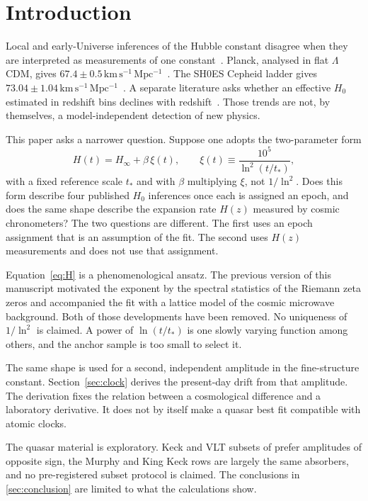 \section{Introduction}
\label{sec:intro}

Local and early-Universe inferences of the Hubble constant disagree when they are interpreted as measurements of one constant~\citep{DiValentino2021,Schoneberg2022}.
Planck, analysed in flat $\Lambda$CDM, gives $67.4\pm0.5\,\mathrm{km\,s^{-1}\,Mpc^{-1}}$~\citep{Planck2018VI}.
The SH0ES Cepheid ladder gives $73.04\pm1.04\,\mathrm{km\,s^{-1}\,Mpc^{-1}}$~\citep{RiessSH0ES2022}.
A separate literature asks whether an effective $H_{0}$ estimated in redshift bins declines with redshift~\citep{Krishnan2020,Dainotti2021,Colgain2022}.
Those trends are not, by themselves, a model-independent detection of new physics.

This paper asks a narrower question.
Suppose one adopts the two-parameter form
\begin{equation}
  H(t)=H_{\infty}+\beta\,\xi(t),
  \qquad
  \xi(t)\equiv\frac{10^{5}}{\ln^{2}(t/t_{*})},
  \label{eq:H}
\end{equation}
with a fixed reference scale $t_{*}$ and with $\beta$ multiplying $\xi$, not $1/\ln^{2}$.
Does this form describe four published $H_{0}$ inferences once each is assigned an epoch, and does the same shape describe the expansion rate $H(z)$ measured by cosmic chronometers?
The two questions are different.
The first uses an epoch assignment that is an assumption of the fit.
The second uses $H(z)$ measurements and does not use that assignment.

Equation~\eqref{eq:H} is a phenomenological ansatz.
The previous version of this manuscript motivated the exponent by the spectral statistics of the Riemann zeta zeros and accompanied the fit with a lattice model of the cosmic microwave background.
Both of those developments have been removed.
No uniqueness of $1/\ln^{2}$ is claimed.
A power of $\ln(t/t_{*})$ is one slowly varying function among others, and the anchor sample is too small to select it.

The same shape is used for a second, independent amplitude in the fine-structure constant.
Section~\ref{sec:clock} derives the present-day drift from that amplitude.
The derivation fixes the relation between a cosmological difference and a laboratory derivative.
It does not by itself make a quasar best fit compatible with atomic clocks.

The quasar material is exploratory.
Keck and VLT subsets of \citep{King2012} prefer amplitudes of opposite sign, the Murphy and King Keck rows are largely the same absorbers, and no pre-registered subset protocol is claimed.
The conclusions in \cref{sec:conclusion} are limited to what the calculations show.
